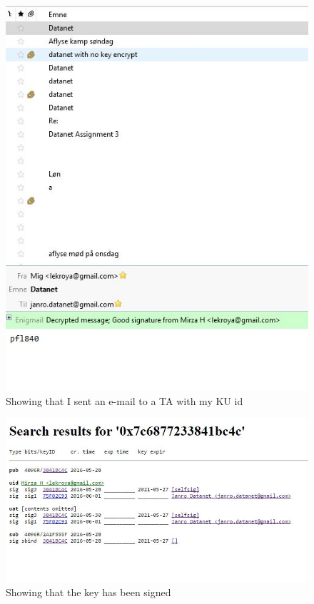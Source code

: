 \documentclass{sig-alternate-05-2015}
\begin{document}
\begin{figure}[H]
  \centering
  \includegraphics[scale=1]{pfl840.jpg}
  \caption{Showing that I sent an e-mail to a TA with my KU id}
\end{figure}
\begin{figure}[H]
  \centering
  \includegraphics[scale=1]{mitsignedkey.jpg}
  \caption{Showing that the key has been signed}
\end{figure}






\end{document}
